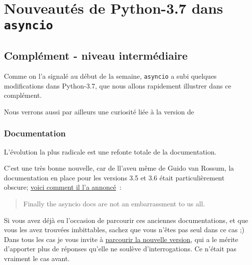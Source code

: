     
    
    
    

    

    \hypertarget{nouveautuxe9s-de-python-3.7-dans-asyncio}{%
\section{\texorpdfstring{Nouveautés de Python-3.7 dans
\texttt{asyncio}}{Nouveautés de Python-3.7 dans asyncio}}\label{nouveautuxe9s-de-python-3.7-dans-asyncio}}

    \hypertarget{compluxe9ment---niveau-intermuxe9diaire}{%
\subsection{Complément - niveau
intermédiaire}\label{compluxe9ment---niveau-intermuxe9diaire}}

    Comme on l'a signalé au début de la semaine, \texttt{asyncio} a subi
quelques modifications dans Python-3.7, que nous allons rapidement
illustrer dans ce complément.

Nous verrons aussi par ailleurs une curiosité liée à la version de

    \hypertarget{documentation}{%
\subsubsection{Documentation}\label{documentation}}

    L'évolution la plus radicale est une refonte totale de la documentation.

C'est une très bonne nouvelle, car de ll'aveu même de Guido van Rossum,
la documentation en place pour les versions 3.5 et 3.6 était
particulièrement obscure;
\href{https://twitter.com/gvanrossum/status/1041889574052429826?lang=en}{voici
comment il l'a annoncé}~:

\begin{quote}
Finally the asyncio docs are not an embarrassment to us all.
\end{quote}

Si vous avez déjà eu l'occasion de parcourir ces anciennes
documentations, et que vous les avez trouvées imbittables, sachez que
vous n'êtes pas seul dans ce cas ;) Dans tous les cas je vous invite à
\href{https://docs.python.org/3/library/asyncio.html}{parcourir la
nouvelle version}, qui a le mérite d'apporter plus de réponses qu'elle
ne soulève d'interrogations. Ce n'était pas vraiment le cas avant.

